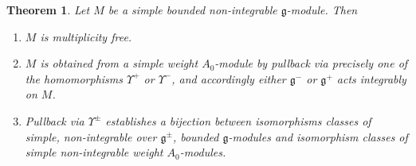 \documentclass[12pt]{amsart}
\theoremstyle{plain} %
\numberwithin{equation}{section}
\theoremstyle{definition}
\theoremstyle{remark}
\theoremstyle{plain} %
\newtheorem{theorem}[definition]{Theorem}
\renewcommand{\gg}{\mathfrak{g}}
\def\gg{\mathfrak{g}}
\begin{document}
          \begin{theorem}\label{thm:sl-simple} Let $M$ be a simple bounded non-integrable $\gg$-module. Then
              \begin{enumerate}
              \item[(a)] $M$ is multiplicity free.
              \item[(b)] $M$ is obtained from a simple weight $A_0$-module by pullback via precisely one of the homomorphisms
                $\Upsilon^+$ or $\Upsilon^-$, and accordingly either $\gg^-$ or $\gg^+$ acts integrably on $M$.
              \item[(c)] Pullback via $\Upsilon^\pm$  establishes a bijection between isomorphisms classes of simple, non-integrable over
                $\gg^\pm$, bounded
                $\gg$-modules and isomorphism classes of simple non-integrable weight $A_0$-modules.
                \end{enumerate}
          
              \end{theorem}
\end{document}
